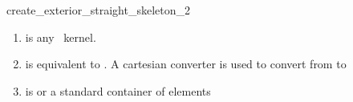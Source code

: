 \begin{ccRefFunction}{create_exterior_straight_skeleton_2}

\begin{enumerate}  
   \item    {} is any \cgal\ kernel.
   \item    {} is equivalent to .
            A cartesian converter is used to convert from  to 
   \item    {} is  or a standard container of  elements 
\end{enumerate}


\ccSeeAlso
{}\\
 \\

\end{ccRefFunction}


